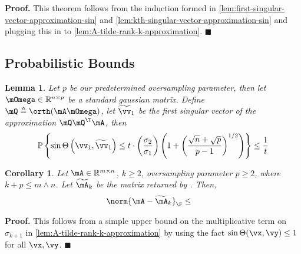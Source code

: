 \documentclass[10pt]{article}
\newcommand{\ccref}[1]{\textcolor{darkred}{\cref{#1}}}
\newcommand{\Ccref}[1]{\textcolor{darkred}{\Cref{#1}}}
\theoremstyle{plain}
\newtheorem{lemma}[theorem]{Lemma}
\newtheorem{corollary}[theorem]{Corollary}
\theoremstyle{definition}
\theoremstyle{remark}
\begin{document}
{\bf Proof.}
This theorem follows from the induction formed in \ccref{lem:first-singular-vector-approximation-sin} and \ccref{lem:kth-singular-vector-approximation-sin} and plugging this in to \ccref{lem:A-tilde-rank-k-approximation}. \hfill $\blacksquare$

\subsection{Probabilistic Bounds}
\begin{lemma} \label{lem:first-right-singular-vector-approximation-sin-prop}
	Let $p$ be our predetermined oversampling parameter, then let $\mOmega \in \mathbb{R}^{n \times p}$ be a standard gaussian matrix. Define $\mQ \triangleq \orth(\mA\mOmega)$, let $\widetilde{\vv}_1$ be the first singular vector of the approximation $\mQ\mQ^{\T}\mA$, then 
	\begin{equation}
		\begin{aligned}
			\mathbb{P}\left\{\sin\Theta\left(\vv_1,\widetilde{\vv}_1\right) \leq t\cdot\left(\frac{\sigma_2}{\sigma_1}\right)\left(1 + \left(\frac{\sqrt{n}+\sqrt{p}}{p-1}\right)^{1/2}\right)\right\} \leq \frac{1}{t}
		\end{aligned}
	\end{equation}
\end{lemma}
\begin{corollary} \label{cor:worst-case-frobenius-error}
	Let $\mA \in \mathbb{R}^{m \times n}$, $k \geq 2$, oversampling parameter $p \geq 2$, where $k + p \leq m \land n$. Let $\widetilde{\mA}_k$ be the matrix returned by \Ccref{alg:optimal-sampling}. Then, 
	\begin{equation}
		\begin{aligned}
			\norm{\mA - \widetilde{\mA}_k}_{\F} &\leq
		\end{aligned}
	\end{equation}
\end{corollary} 
{\bf Proof. }This follows from a simple upper bound on the multiplicative term on $\sigma_{k+1}$ in \ccref{lem:A-tilde-rank-k-approximation} by using the fact $\sin\Theta(\vx,\vy) \leq 1$ for all $\vx, \vy$. \hfill $\blacksquare$ 
\end{document}
